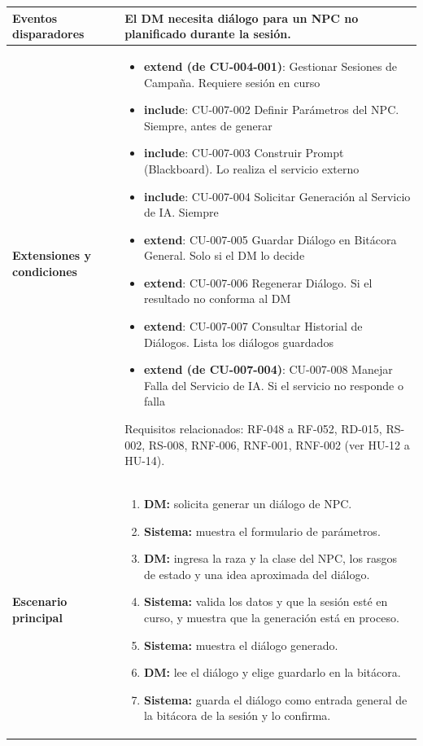 {\begin{longtable}{|>{\raggedright\arraybackslash\bfseries}p{3.2cm}|>{\raggedright\arraybackslash}p{11.9cm}|}
Eventos disparadores & El DM necesita diálogo para un NPC no planificado durante la sesión. \\ \hline
Extensiones y condiciones & \begin{itemize}[itemsep=2pt,topsep=2pt]
\item \textbf{extend (de CU-004-001)}: Gestionar Sesiones de Campaña. Requiere sesión en curso
\item \textbf{include}: CU-007-002 Definir Parámetros del NPC. Siempre, antes de generar
\item \textbf{include}: CU-007-003 Construir Prompt (Blackboard). Lo realiza el servicio externo
\item \textbf{include}: CU-007-004 Solicitar Generación al Servicio de IA. Siempre
\item \textbf{extend}: CU-007-005 Guardar Diálogo en Bitácora General. Solo si el DM lo decide
\item \textbf{extend}: CU-007-006 Regenerar Diálogo. Si el resultado no conforma al DM
\item \textbf{extend}: CU-007-007 Consultar Historial de Diálogos. Lista los diálogos guardados
\item \textbf{extend (de CU-007-004)}: CU-007-008 Manejar Falla del Servicio de IA. Si el servicio no responde o falla
\end{itemize}
Requisitos relacionados: RF-048 a RF-052, RD-015, RS-002, RS-008, RNF-006, RNF-001, RNF-002 (ver HU-12 a HU-14). \\ \hline
Escenario principal & \begin{enumerate}[itemsep=2pt,topsep=2pt]
\item \textbf{DM:} solicita generar un diálogo de NPC.
\item \textbf{Sistema:} muestra el formulario de parámetros.
\item \textbf{DM:} ingresa la raza y la clase del NPC, los rasgos de estado y una idea aproximada del diálogo.
\item \textbf{Sistema:} valida los datos y que la sesión esté en curso, y muestra que la generación está en proceso.
\item \textbf{Sistema:} muestra el diálogo generado.
\item \textbf{DM:} lee el diálogo y elige guardarlo en la bitácora.
\item \textbf{Sistema:} guarda el diálogo como entrada general de la bitácora de la sesión y lo confirma.
\end{enumerate} \\ \hline

\end{longtable}}
